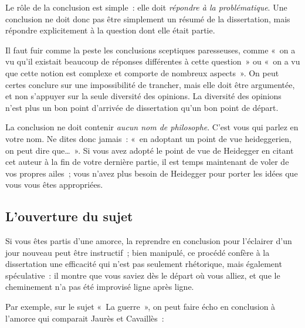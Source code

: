 \documentclass[a4paper]{article}
\begin{document}
Le rôle de la conclusion est simple : elle doit \emph{répondre à la problématique}. Une conclusion ne doit donc pas être simplement un
résumé de la dissertation, mais répondre explicitement à la question
dont elle était partie.

Il faut fuir comme la peste les conclusions sceptiques paresseuses,
comme « on a vu qu'il existait beaucoup de réponses différentes à cette
question » ou « on a vu que cette notion est complexe et comporte de
nombreux aspects ». On peut certes conclure sur une impossibilité de
trancher, mais elle doit être argumentée, et non s'appuyer sur la seule
diversité des opinions. La diversité des opinions n'est plus un bon
point d'arrivée de dissertation qu'un bon point de départ.

La conclusion ne doit contenir \emph{aucun nom de philosophe}. C'est vous qui
parlez en votre nom. Ne dites donc jamais : « en adoptant un point de vue
heideggerien, on peut dire que\ldots{} ». Si vous avez adopté le point de vue
de Heidegger en citant cet auteur à la fin de votre dernière partie, il
est temps maintenant de voler de vos propres ailes ; vous n'avez plus
besoin de Heidegger pour porter les idées que vous vous êtes
appropriées.
\subsection{L'ouverture du sujet}
\label{sec-4-2}


Si vous êtes partis d'une amorce, la reprendre en conclusion pour
l'éclairer d'un jour nouveau peut être instructif ; bien manipulé, ce
procédé confère à la dissertation une efficacité qui n'est pas seulement
rhétorique, mais également spéculative : il montre que vous saviez dès
le départ où vous alliez, et que le cheminement n'a pas été improvisé
ligne après ligne.

Par exemple, sur le sujet « La guerre », on peut faire écho en conclusion
à l'amorce qui comparait Jaurès et Cavaillès :
\end{document}

